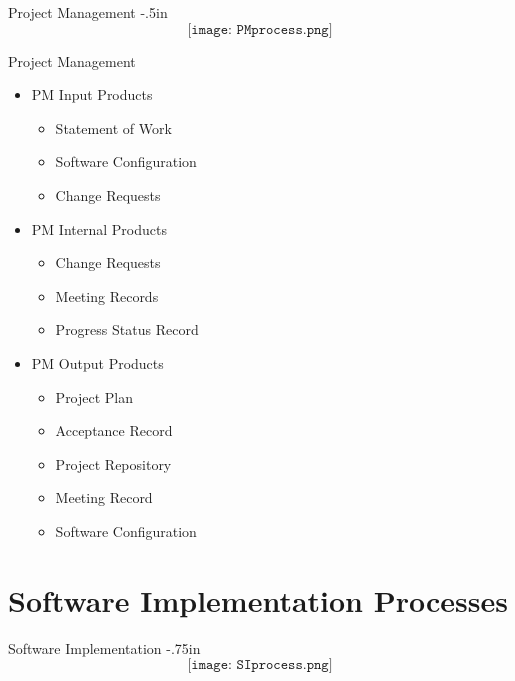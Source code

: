 \begin{frame}{Project Management}
\null
\kern -.5in
$$\texttt{[image: PMprocess.png]}$$
\end{frame}


\begin{frame}{Project Management}
\begin{itemize}
\item PM Input Products
\begin{itemize}
\item Statement of Work
\item Software Configuration
\item Change Requests
\end{itemize}
\item PM Internal Products
\begin{itemize}
\item Change Requests
\item Meeting Records
\item Progress Status Record
\end{itemize}
\item PM Output Products
\begin{itemize}
\item Project Plan
\item Acceptance Record
\item Project Repository
\item Meeting Record
\item Software Configuration
\end{itemize}
\end{itemize}
\end{frame}

\section{Software Implementation Processes}
\begin{frame}{Software Implementation}
\null
\kern -.75in
$$\texttt{[image: SIprocess.png]}$$
\end{frame}


